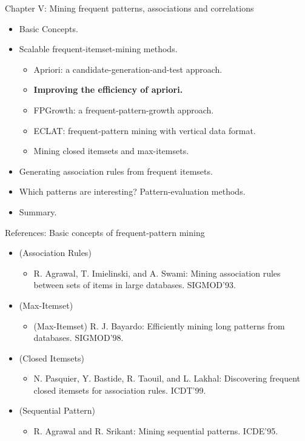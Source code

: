 \documentclass[aspectratio=169,t]{beamer}
\begin{document}
  { 
    \begin{frame}{Chapter V: Mining frequent patterns, associations and correlations}
        \begin{itemize}
            \item Basic Concepts.
            \item Scalable frequent-itemset-mining methods.
            \begin{itemize}
              \item Apriori: a candidate-generation-and-test approach.
              \item \textbf{Improving the efficiency of apriori.}
              \item FPGrowth:  a frequent-pattern-growth approach.
              \item ECLAT: frequent-pattern mining with vertical data format.
              \item Mining closed itemsets and max-itemsets.
            \end{itemize}
            \item Generating association rules from frequent itemsets.
            \item Which patterns are interesting? Pattern-evaluation methods.
            \item Summary.
        \end{itemize}
    \end{frame}
  }

  {
    \begin{frame}{References: Basic concepts of frequent-pattern mining}
    \begin{itemize}
      \item (Association Rules)
      \begin{itemize}
        \item R. Agrawal, T. Imielinski, and A. Swami: Mining association rules between sets of items in large databases. SIGMOD'93.
      \end{itemize}
      \item (Max-Itemset)
      \begin{itemize}
        \item (Max-Itemset) R. J. Bayardo: Efficiently mining long patterns from databases. SIGMOD'98.
      \end{itemize}
      \item (Closed Itemsets)
      \begin{itemize}
        \item N. Pasquier, Y. Bastide, R. Taouil, and L. Lakhal: Discovering frequent closed itemsets for association rules. ICDT'99.
      \end{itemize}
      \item (Sequential Pattern)
      \begin{itemize}
        \item R. Agrawal and R. Srikant: Mining sequential patterns. ICDE'95.
      \end{itemize}
    \end{itemize}
    \end{frame}
  }
\end{document}
